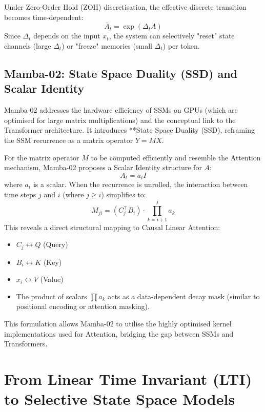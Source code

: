 \documentclass[a4paper,11pt]{article}
\begin{document}
Under Zero-Order Hold (ZOH) discretisation, the effective discrete transition becomes time-dependent:
\begin{equation}
    \overline{A}_t = \exp(\Delta_t A)
\end{equation}
Since $\Delta_t$ depends on the input $x_t$, the system can selectively "reset" state channels (large $\Delta_t$) or "freeze" memories (small $\Delta_t$) per token.

\subsection{Mamba-02: State Space Duality (SSD) and Scalar Identity}

Mamba-02 addresses the hardware efficiency of SSMs on GPUs (which are optimised for large matrix multiplications) and the conceptual link to the Transformer architecture. It introduces **State Space Duality (SSD), reframing the SSM recurrence as a matrix operator $Y=MX$.

For the matrix operator $M$ to be computed efficiently and resemble the Attention mechanism, Mamba-02 proposes a Scalar Identity structure for $A$:
\begin{equation}
    A_t = a_t I
\end{equation}
where $a_t$ is a scalar. When the recurrence is unrolled, the interaction between time steps $j$ and $i$ (where $j \ge i$) simplifies to:
\begin{equation}
    M_{ji} = (C_j^\top B_i) \cdot \prod_{k=i+1}^{j} a_k
\end{equation}
This reveals a direct structural mapping to Causal Linear Attention:
\begin{itemize}
    \item $C_j \leftrightarrow Q$ (Query)
    \item $B_i \leftrightarrow K$ (Key)
    \item $x_i \leftrightarrow V$ (Value)
    \item The product of scalars $\prod a_k$ acts as a data-dependent decay mask (similar to positional encoding or attention masking).
\end{itemize}
This formulation allows Mamba-02 to utilise the highly optimised kernel implementations used for Attention, bridging the gap between SSMs and Transformers.


\section{From Linear Time Invariant (LTI) to Selective State Space Models}
\end{document}

